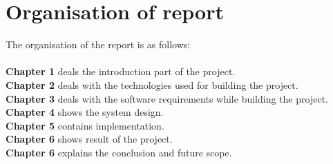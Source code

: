 \section{Organisation of report}
The organisation of the report is as follows:\\\\
\textbf{Chapter 1} deals the introduction part of the project.\\
\textbf{Chapter 2} deals with the technologies used for building the project.\\
\textbf{Chapter 3} deals with the software requirements while building the project.\\
\textbf{Chapter 4} shows the system design.\\
\textbf{Chapter 5} contains implementation.\\
\textbf{Chapter 6} shows result of the project.\\
\textbf{Chapter 6} explains the conclusion and future scope.\\
\newpage